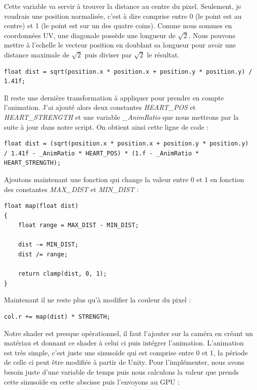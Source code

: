 \documentclass{article}
\begin{document}
Cette variable va servir à trouver la distance au centre du pixel. Seulement, je voudrais une position normalisée, c'est à dire comprise entre 0 (le point est au centre) et 1 (le point est sur un des quatre coins). Comme nous sommes en coordonnées UV, une diagonale possède une longueur de $\sqrt{2}$.
Nous pouvons mettre à l'echelle le vecteur position en doublant sa longueur pour avoir une distance maximale de $\sqrt{2}$ puis diviser par $\sqrt{2}$ le résultat.

\begin{lstlisting}
float dist = sqrt(position.x * position.x + position.y * position.y) / 1.41f;
\end{lstlisting}

Il reste une dernière transformation à appliquer pour prendre en compte l'animation.
J'ai ajouté alors deux constantes \emph{HEART\_POS} et \emph{HEART\_STRENGTH} et une variable \emph{\_AnimRatio} que nous mettrons par la suite à jour dans notre script.
On obtient ainsi cette ligne de code :

\begin{lstlisting}
float dist = (sqrt(position.x * position.x + position.y * position.y) / 1.41f - _AnimRatio * HEART_POS) * (1.f - _AnimRatio * HEART_STRENGTH);
\end{lstlisting}

Ajoutons maintenant une fonction qui change la valeur entre 0 et 1 en fonction des constantes \emph{MAX\_DIST} et \emph{MIN\_DIST} :

\begin{lstlisting}
float map(float dist)
{
    float range = MAX_DIST - MIN_DIST;

    dist -= MIN_DIST;
    dist /= range;

    return clamp(dist, 0, 1);
}
\end{lstlisting}

Maintenant il ne reste plus qu'à modifier la couleur du pixel :

\begin{lstlisting}
col.r += map(dist) * STRENGTH;
\end{lstlisting}

Notre shader est presque opérationnel, il faut l'ajouter sur la caméra en créant un matériau et donnant ce shader à celui ci puis intégrer l'animation. L'animation est très simple, c'est juste une sinusoïde qui est comprise entre 0 et 1, la période de celle ci peut être modifiée à partir de Unity. Pour l'implémenter, nous avons besoin juste d'une variable de temps puis nous calculons la valeur que prends cette sinusoïde en cette abscisse puis l'envoyons au GPU :
\end{document}
